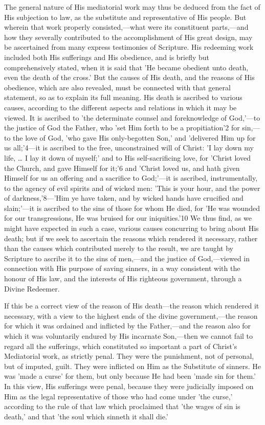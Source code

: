 \documentclass[
]{book}
\begin{document}
The general nature of His mediatorial work may thus be deduced from the fact of His subjection to law, as the substitute and representative of His people. But wherein that work properly consisted,---what were its constituent parts,---and how they severally contributed to the accomplishment of His great design, may be ascertained from many express testimonies of Scripture. His redeeming work included both His sufferings and His obedience, and is briefly but comprehensively stated, when it is said that 'He became obedient unto death, even the death of the cross.' But the causes of His death, and the reasons of His obedience, which are also revealed, must be connected with that general statement, so as to explain its full meaning. His death is ascribed to various causes, according to the different aspects and relations in which it may be viewed. It is ascribed to 'the determinate counsel and foreknowledge of God,'---to the justice of God the Father, who 'set Him forth to be a propitiation'2 for sin,---to the love of God, 'who gave His only-begotten Son,' and 'delivered Him up for us all;'4---it is ascribed to the free, unconstrained will of Christ: 'I lay down my life, \ldots{} I lay it down of myself;' and to His self-sacrificing love, for 'Christ loved the Church, and gave Himself for it;'6 and 'Christ loved us, and hath given Himself for us an offering and a sacrifice to God;'---it is ascribed, instrumentally, to the agency of evil spirits and of wicked men: 'This is your hour, and the power of darkness,'8---'Him ye have taken, and by wicked hands have crucified and slain;'---it is ascribed to the sins of those for whom He died, for 'He was wounded for our transgressions, He was bruised for our iniquities.'10 We thus find, as we might have expected in such a case, various causes concurring to bring about His death; but if we seek to ascertain the reasons which rendered it necessary, rather than the causes which contributed merely to the result, we are taught by Scripture to ascribe it to the sins of men,---and the justice of God,---viewed in connection with His purpose of saving sinners, in a way consistent with the honour of His law, and the interests of His righteous government, through a Divine Redeemer.

If this be a correct view of the reason of His death---the reason which rendered it necessary, with a view to the highest ends of the divine government,---the reason for which it was ordained and inflicted by the Father,---and the reason also for which it was voluntarily endured by His incarnate Son,---then we cannot fail to regard all the sufferings, which constituted so important a part of Christ's Mediatorial work, as strictly penal. They were the punishment, not of personal, but of imputed, guilt. They were inflicted on Him as the Substitute of sinners. He was 'made a curse' for them, but only because He had been 'made sin for them.' In this view, His sufferings were penal, because they were judicially imposed on Him as the legal representative of those who had come under 'the curse,' according to the rule of that law which proclaimed that 'the wages of sin is death,' and that 'the soul which sinneth it shall die.'
\end{document}
